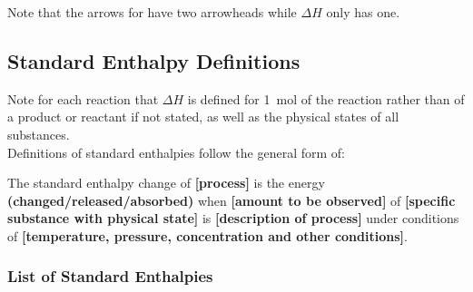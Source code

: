 \documentclass[../main]{subfiles}
\begin{document}
	Note that the arrows for  have two arrowheads while \(\Delta H\) only has one.

	\subsection{Standard Enthalpy Definitions}



	Note for each reaction that \(\Delta H\) is defined for \SI{1}{\mol} of the reaction rather than of a product or reactant if not stated, as well as the physical states of all substances. \\

	Definitions of standard enthalpies follow the general form of:

	\begin{center}
	The standard enthalpy change of \textbf{[process]} is the energy \textbf{(changed/released/absorbed)} when \textbf{[amount to be observed]} of \textbf{[specific substance with physical state]} is \textbf{[description of process]} under conditions of \textbf{[temperature, pressure, concentration and other conditions]}.
	\end{center}

	\subsubsection{List of Standard Enthalpies}
\end{document}
